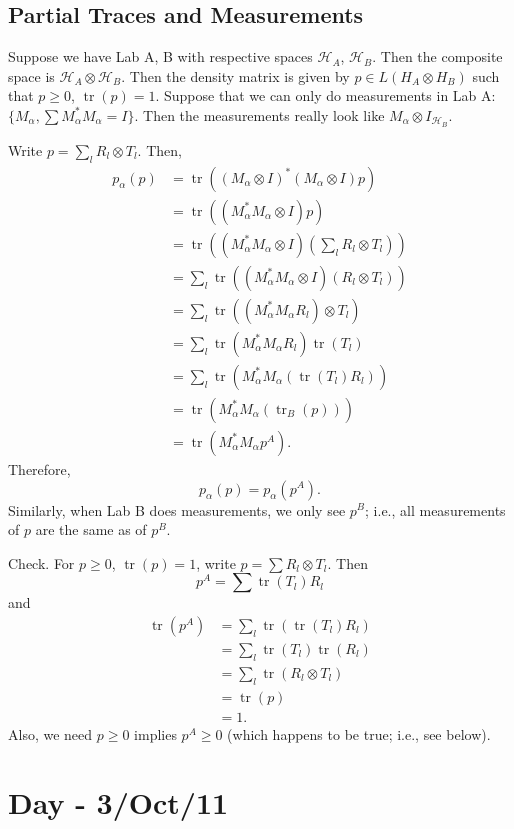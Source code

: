 \documentclass[12pt]{article}
\theoremstyle{definition}
\DeclareMathOperator{\tr}{tr}
\begin{document}
\subsection{Partial Traces and Measurements}

Suppose we have Lab A, B with respective spaces $\mathcal{H}_A$, $\mathcal{H}_B$. Then the composite space is $\mathcal{H}_A \otimes \mathcal{H}_B$. Then the density matrix is given by $p \in L(H_A \otimes H_B)$ such that $p \geq 0$, $\tr(p)=1$. Suppose that we can only do measurements in Lab A: $\{M_\alpha, \sum M_\alpha^*M_\alpha = I\}$. Then the measurements really look like $M_\alpha \otimes I_{\mathcal{H}_B}$.

Write $p = \sum_l R_l \otimes T_l$. Then,
\begin{align*}
p_\alpha(p) &= \tr((M_\alpha \otimes I)^*(M_\alpha \otimes I)p) \\
&= \tr((M_\alpha^*M_\alpha \otimes I)p) \\
&= \tr\left((M_\alpha^*M_\alpha \otimes I)\left(\sum_l R_l \otimes T_l\right)\right) \\
&= \sum_l \tr((M_\alpha^*M_\alpha \otimes I)(R_l \otimes T_l)) \\
&= \sum_l \tr((M_\alpha^*M_\alpha R_l) \otimes T_l) \\
&= \sum_l \tr(M_\alpha^*M_\alpha R_l)\tr(T_l) \\
&= \sum_l \tr(M_\alpha^*M_\alpha(\tr(T_l)R_l)) \\
&= \tr(M_\alpha^*M_\alpha(\tr_B(p))) \\
&= \tr(M_\alpha^*M_\alpha p^A).
\end{align*}
Therefore,
\[
p_\alpha(p)=p_\alpha(p^A).
\]
Similarly, when Lab B does measurements, we only see $p^B$; i.e., all measurements of $p$ are the same as of $p^B$.

Check. For $p \geq 0$, $\tr(p)=1$, write $p=\sum R_l \otimes T_l$. Then
\[
p^A = \sum \tr(T_l)R_l
\]
and
\begin{align*}
\tr(p^A) &= \sum_l \tr(\tr(T_l)R_l) \\
&= \sum_l \tr(T_l)\tr(R_l) \\
&= \sum_l \tr(R_l \otimes T_l) \\
&= \tr(p) \\
&= 1.
\end{align*}
Also, we need $p \geq 0$ implies $p^A \geq 0$ (which happens to be true; i.e., see below).

\section{Day - 3/Oct/11}
\end{document}
